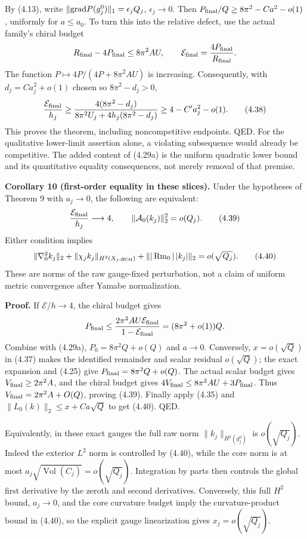 \documentclass[
  11pt,
]{article}
\begin{document}
By (4.13), write \(\|{\rm grad}P(g_j^0)\|_1=\epsilon_jQ_j\),
\(\epsilon_j\to0\). Then \(P_{\rm final}/Q\ge 8\pi^2-Ca^2-o(1)\),
uniformly for \(a\le a_0\). To turn this into the relative defect, use
the actual family's chiral budget \[
 R_{\rm final}-4P_{\rm final}\le8\pi^2A U,\qquad
 \mathcal E_{\rm final}=\frac{4P_{\rm final}}{R_{\rm final}}.
\] The function \(P\mapsto4P/(4P+8\pi^2AU)\) is increasing.
Consequently, with \(d_j=Ca_j^2+o(1)\) chosen so \(8\pi^2-d_j>0\), \[
 \frac{\mathcal E_{\rm final}}{h_j}
 \ge\frac{4(8\pi^2-d_j)}
             {8\pi^2U_j+4h_j(8\pi^2-d_j)}
 \ge 4-C'a_j^2-o(1). \tag{4.38}
\] This proves the theorem, including noncompetitive endpoints. QED. For
the qualitative lower-limit assertion alone, a violating subsequence
would already be competitive. The added content of (4.29a) is the
uniform quadratic lower bound and its quantitative equality
consequences, not merely removal of that premise.

\textbf{Corollary 10 (first-order equality in these slices).} Under the
hypotheses of Theorem 9 with \(a_j\to0\), the following are equivalent:
\[
 \frac{\mathcal E_{\rm final}}{h_j}\longrightarrow4,
 \qquad \|\mathcal A_0(k_j)\|_2^2=o(Q_j). \tag{4.39}
\] Either condition implies \[
 \|\nabla_0^2k_j\|_2+
 \|\chi_j k_j\|_{H^2(X_j,g_{\rm CH})}
 +\||\operatorname{Rm}_0|\,|k_j|\|_2=o(\sqrt{Q_j}). \tag{4.40}
\] These are norms of the raw gauge-fixed perturbation, not a claim of
uniform metric convergence after Yamabe normalization.

\textbf{Proof.} If \(\mathcal E/h\to4\), the chiral budget gives \[
 P_{\rm final}\le
 \frac{2\pi^2AU\mathcal E_{\rm final}}{1-\mathcal E_{\rm final}}
       =(8\pi^2+o(1))Q.
\] Combine with (4.29a), \(P_0=8\pi^2Q+o(Q)\) and \(a\to0\). Conversely,
\(x=o(\sqrt Q)\) in (4.37) makes the identified remainder and scalar
residual \(o(\sqrt Q)\); the exact expansion and (4.25) give
\(P_{\rm final}=8\pi^2Q+o(Q)\). The actual scalar budget gives
\(V_{\rm final}\ge2\pi^2A\), and the chiral budget gives
\(4V_{\rm final}\le8\pi^2AU+3P_{\rm final}\). Thus
\(V_{\rm final}=2\pi^2A+O(Q)\), proving (4.39). Finally apply (4.35) and
\(\|L_0(k)\|_2\le x+Ca\sqrt Q\) to get (4.40). QED.

Equivalently, in these exact gauges the full raw norm
\(\|k_j\|_{H^2(g_j^0)}\) is \(o(\sqrt{Q_j})\). Indeed the exterior
\(L^2\) norm is controlled by (4.40), while the core norm is at most
\(a_j\sqrt{\operatorname{Vol}(C_j)} =o(\sqrt{Q_j})\). Integration by
parts then controls the global first derivative by the zeroth and second
derivatives. Conversely, this full \(H^2\) bound, \(a_j\to0\), and the
core curvature budget imply the curvature-product bound in (4.40), so
the explicit gauge linearization gives \(x_j=o(\sqrt{Q_j})\).
\end{document}
